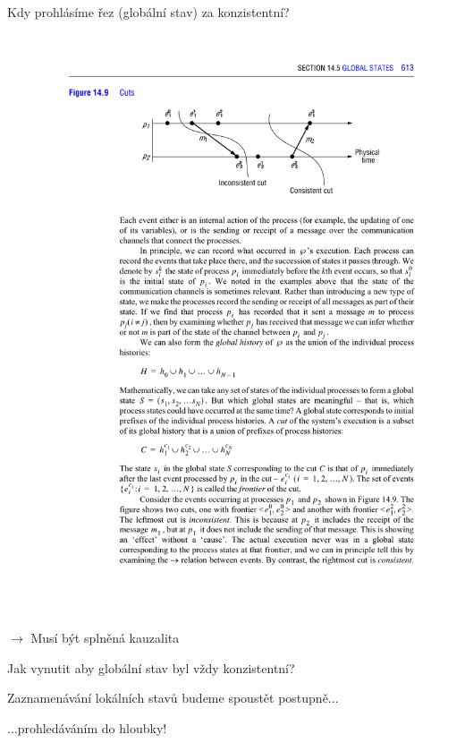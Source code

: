 \documentclass[usenames,dvipsnames,9pt]{beamer}
\begin{document}
\begin{frame}

Kdy prohlásíme řez (globální stav) za konzistentní?

\vspace{1em}

\begin{center}
\includegraphics[width=.9\linewidth]{13/figs/cuts.pdf}
\end{center}

\pause\vspace{1em}

\hfill $\rightarrow$ Musí být splněná kauzalita

\begin{center}
\LARGE Jak vynutit aby globální stav byl vždy konzistentní?
\end{center}

\end{frame}

\begin{frame}
\begin{center}
\large Zaznamenávání lokálních stavů budeme spoustět postupně...
\end{center}
\vspace{2em}
\begin{center}
\LARGE ...prohledáváním do hloubky!
\end{center}
\end{frame}
\end{document}
